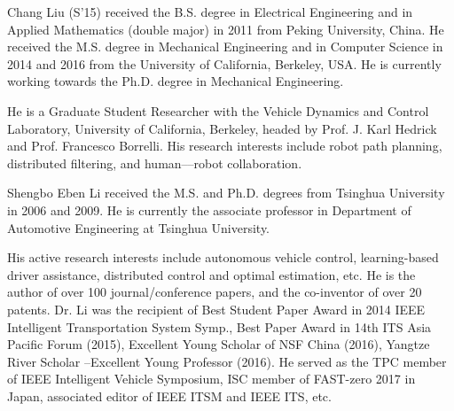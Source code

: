 \documentclass[journal]{IEEEtranTIE}
\theoremstyle{remark}
\begin{document}
	{\color{black}
		
			\vspace{-1cm}
		\begin{IEEEbiography}
			{Chang Liu} (S'15) received the B.S. degree in Electrical Engineering and in Applied Mathematics (double major) in 2011 from Peking University, China. He received the M.S. degree in Mechanical Engineering and in Computer Science in 2014 and 2016 from the University of California, Berkeley, USA. He is currently working towards the Ph.D. degree in Mechanical Engineering. 
			
			He is a Graduate Student Researcher with the Vehicle Dynamics and Control Laboratory, University of California, Berkeley, headed by Prof. J. Karl Hedrick and Prof. Francesco Borrelli. His research interests include robot path planning, distributed filtering, and human–--robot collaboration.

		\end{IEEEbiography}
		
		\vspace{-1.3cm}
		\begin{IEEEbiography}
			{Shengbo Eben Li} received the M.S. and Ph.D. degrees from Tsinghua University in 2006 and 2009. He is currently the associate professor in Department of Automotive Engineering at Tsinghua University. 
			
			His active research interests include autonomous vehicle control, learning-based driver assistance, distributed control and optimal estimation, etc. He is the author of over 100 journal/conference papers, and the co-inventor of over 20 patents. Dr. Li was the recipient of Best Student Paper Award in 2014 IEEE Intelligent Transportation System Symp., Best Paper Award in 14th ITS Asia Pacific Forum (2015), Excellent Young Scholar of NSF China (2016), Yangtze River Scholar –Excellent Young Professor (2016). He served as the TPC member of IEEE Intelligent Vehicle Symposium, ISC member of FAST-zero 2017 in Japan, associated editor of IEEE ITSM and IEEE ITS, etc.\\ 
		\end{IEEEbiography}
		
}
\end{document}

